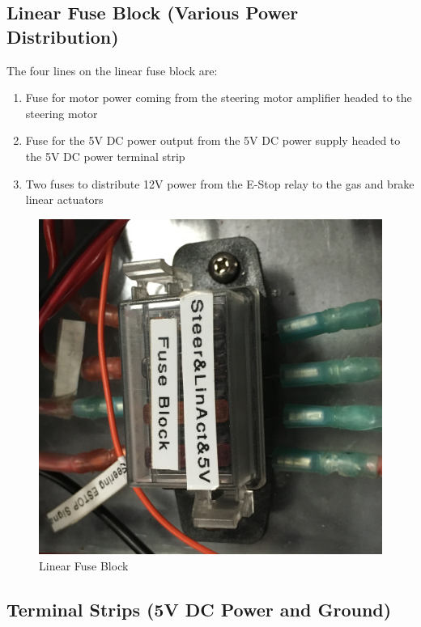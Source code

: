 \subsection{Linear Fuse Block (Various Power Distribution)}

\begin{minipage}{0.6\textwidth}
The four lines on the linear fuse block are:
\begin{enumerate}
\item Fuse for motor power coming from the steering motor amplifier headed to the steering motor
\item Fuse for the 5V DC power output from the 5V DC power supply headed to the 5V DC power terminal strip
\item Two fuses to distribute 12V power from the E-Stop relay to the gas and brake linear actuators
\end{enumerate}
\end{minipage} \hfill
\begin{minipage}{0.5\textwidth}
\begin{figure}[H]
\centering
\includegraphics[scale=.06]{Photos/5vblock.jpg}
\caption{\label{fig:linear} Linear Fuse Block}
\end{figure}
\end{minipage}

\subsection{Terminal Strips (5V DC Power and Ground)}

